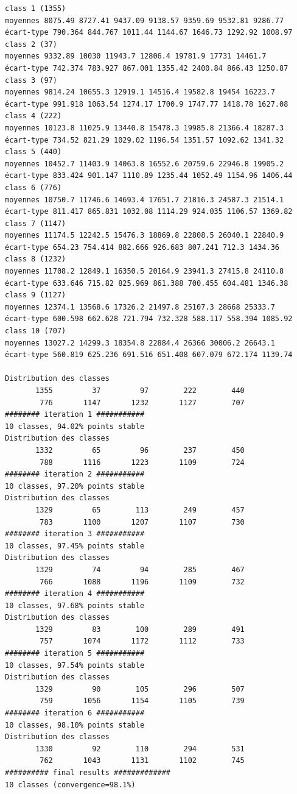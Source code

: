 \documentclass[land,article,submit,pdftex,moreauthors]{Definitions/mdpi}
\begin{document}
\begin{scriptsize}
\begin{verbatim}
class 1 (1355)
moyennes 8075.49 8727.41 9437.09 9138.57 9359.69 9532.81 9286.77
écart-type 790.364 844.767 1011.44 1144.67 1646.73 1292.92 1008.97
class 2 (37)
moyennes 9332.89 10030 11943.7 12806.4 19781.9 17731 14461.7
écart-type 742.374 783.927 867.001 1355.42 2400.84 866.43 1250.87
class 3 (97)
moyennes 9814.24 10655.3 12919.1 14516.4 19582.8 19454 16223.7
écart-type 991.918 1063.54 1274.17 1700.9 1747.77 1418.78 1627.08
class 4 (222)
moyennes 10123.8 11025.9 13440.8 15478.3 19985.8 21366.4 18287.3
écart-type 734.52 821.29 1029.02 1196.54 1351.57 1092.62 1341.32
class 5 (440)
moyennes 10452.7 11403.9 14063.8 16552.6 20759.6 22946.8 19905.2
écart-type 833.424 901.147 1110.89 1235.44 1052.49 1154.96 1406.44
class 6 (776)
moyennes 10750.7 11746.6 14693.4 17651.7 21816.3 24587.3 21514.1
écart-type 811.417 865.831 1032.08 1114.29 924.035 1106.57 1369.82
class 7 (1147)
moyennes 11174.5 12242.5 15476.3 18869.8 22808.5 26040.1 22840.9
écart-type 654.23 754.414 882.666 926.683 807.241 712.3 1434.36
class 8 (1232)
moyennes 11708.2 12849.1 16350.5 20164.9 23941.3 27415.8 24110.8
écart-type 633.646 715.82 825.969 861.388 700.455 604.481 1346.38
class 9 (1127)
moyennes 12374.1 13568.6 17326.2 21497.8 25107.3 28668 25333.7
écart-type 600.598 662.628 721.794 732.328 588.117 558.394 1085.92
class 10 (707)
moyennes 13027.2 14299.3 18354.8 22884.4 26366 30006.2 26643.1
écart-type 560.819 625.236 691.516 651.408 607.079 672.174 1139.74

Distribution des classes
       1355         37         97        222        440
        776       1147       1232       1127        707
######## iteration 1 ###########
10 classes, 94.02% points stable
Distribution des classes
       1332         65         96        237        450
        788       1116       1223       1109        724
######## iteration 2 ###########
10 classes, 97.20% points stable
Distribution des classes
       1329         65        113        249        457
        783       1100       1207       1107        730
######## iteration 3 ###########
10 classes, 97.45% points stable
Distribution des classes
       1329         74         94        285        467
        766       1088       1196       1109        732
######## iteration 4 ###########
10 classes, 97.68% points stable
Distribution des classes
       1329         83        100        289        491
        757       1074       1172       1112        733
######## iteration 5 ###########
10 classes, 97.54% points stable
Distribution des classes
       1329         90        105        296        507
        759       1056       1154       1105        739
######## iteration 6 ###########
10 classes, 98.10% points stable
Distribution des classes
       1330         92        110        294        531
        762       1043       1131       1102        745
########## final results #############
10 classes (convergence=98.1%)


\end{verbatim}
\end{scriptsize}
\end{document}
